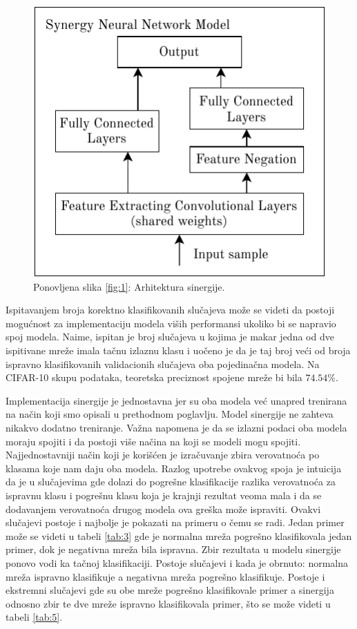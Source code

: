 \begin{figure}
  \centering
  \includegraphics{figures/fig1.pdf}
  {\centering \vskip 0cm Ponovljena slika \ref{fig:1}: Arhitektura sinergije.}
\end{figure}

Ispitavanjem broja korektno klasifikovanih slučajeva može se videti da postoji mogućnost za implementaciju modela viših performansi ukoliko bi se napravio spoj modela. Naime, ispitan je broj slučajeva u kojima je makar jedna od dve ispitivane mreže imala tačnu izlaznu klasu i uočeno je da je taj broj veći od broja ispravno klasifikovanih validacionih slučajeva oba pojedinačna modela. Na CIFAR-10 skupu podataka, teoretska preciznost spojene mreže bi bila $ 74.54\% $.

Implementacija sinergije je jednostavna jer su oba modela već unapred trenirana na način koji smo opisali u prethodnom poglavlju. Model sinergije ne zahteva nikakvo dodatno treniranje. Važna napomena je da se izlazni podaci oba modela moraju spojiti i da postoji više načina na koji se modeli mogu spojiti. Najjednostavniji način koji je korišćen je izračuvanje zbira verovatnoća po klasama koje nam daju oba modela. Razlog upotrebe ovakvog spoja je intuicija da je u slučajevima gde dolazi do pogrešne klasifikacije razlika verovatnoća za ispravnu klasu i pogrešnu klasu koja je krajnji rezultat veoma mala i da se dodavanjem verovatnoća drugog modela ova greška može ispraviti. Ovakvi slučajevi postoje i najbolje je pokazati na primeru o čemu se radi. Jedan primer može se videti u tabeli \ref{tab:3} gde je normalna mreža pogrešno klasifikovala jedan primer, dok je negativna mreža bila ispravna. Zbir rezultata u modelu sinergije ponovo vodi ka tačnoj klasifikaciji. Postoje slučajevi i kada je obrnuto: normalna mreža ispravno klasifikuje a negativna mreža pogrešno klasifikuje. Postoje i ekstremni slučajevi gde su obe mreže pogrešno klasifikovale primer a sinergija odnosno zbir te dve mreže ispravno klasifikovala primer, što se može videti u tabeli \ref{tab:5}.

